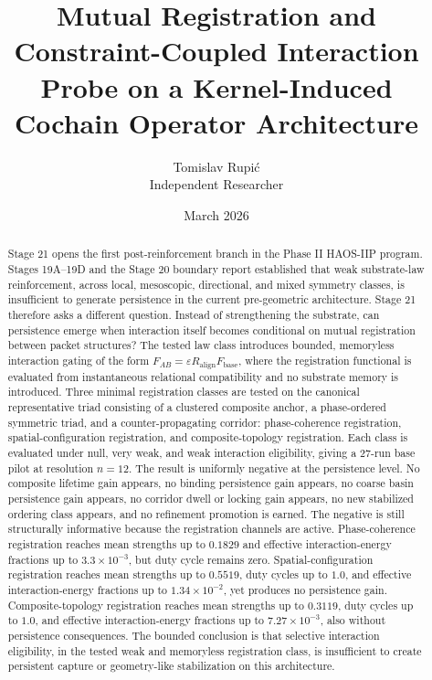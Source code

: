 \documentclass[11pt]{article}
\title{Mutual Registration and Constraint-Coupled Interaction Probe on a Kernel-Induced Cochain Operator Architecture}
\author{Tomislav Rupi\'c \\ Independent Researcher}
\date{March 2026}
\begin{document}
\maketitle

\begin{abstract}
Stage 21 opens the first post-reinforcement branch in the Phase II HAOS-IIP program. Stages 19A--19D and the Stage 20 boundary report established that weak substrate-law reinforcement, across local, mesoscopic, directional, and mixed symmetry classes, is insufficient to generate persistence in the current pre-geometric architecture. Stage 21 therefore asks a different question. Instead of strengthening the substrate, can persistence emerge when interaction itself becomes conditional on mutual registration between packet structures? The tested law class introduces bounded, memoryless interaction gating of the form $F_{AB}=\varepsilon R_{\mathrm{align}}F_{\mathrm{base}}$, where the registration functional is evaluated from instantaneous relational compatibility and no substrate memory is introduced. Three minimal registration classes are tested on the canonical representative triad consisting of a clustered composite anchor, a phase-ordered symmetric triad, and a counter-propagating corridor: phase-coherence registration, spatial-configuration registration, and composite-topology registration. Each class is evaluated under null, very weak, and weak interaction eligibility, giving a 27-run base pilot at resolution $n=12$. The result is uniformly negative at the persistence level. No composite lifetime gain appears, no binding persistence gain appears, no coarse basin persistence gain appears, no corridor dwell or locking gain appears, no new stabilized ordering class appears, and no refinement promotion is earned. The negative is still structurally informative because the registration channels are active. Phase-coherence registration reaches mean strengths up to $0.1829$ and effective interaction-energy fractions up to $3.3\times10^{-3}$, but duty cycle remains zero. Spatial-configuration registration reaches mean strengths up to $0.5519$, duty cycles up to $1.0$, and effective interaction-energy fractions up to $1.34\times10^{-2}$, yet produces no persistence gain. Composite-topology registration reaches mean strengths up to $0.3119$, duty cycles up to $1.0$, and effective interaction-energy fractions up to $7.27\times10^{-3}$, also without persistence consequences. The bounded conclusion is that selective interaction eligibility, in the tested weak and memoryless registration class, is insufficient to create persistent capture or geometry-like stabilization on this architecture.
\end{abstract}
\end{document}
